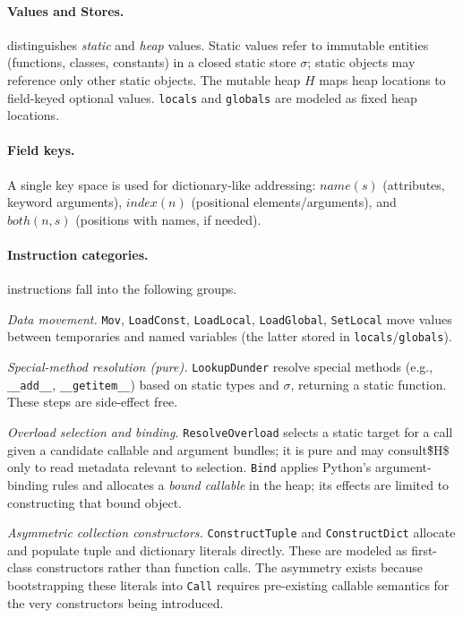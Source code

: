 \paragraph{Values and Stores.}
\spytecode distinguishes \emph{static} and \emph{heap} values. Static values refer to immutable entities (functions, classes, constants) in a closed static store $\sigma$; static objects may reference only other static objects. The mutable heap $H$ maps heap locations to field-keyed optional values. \texttt{locals} and \texttt{globals} are modeled as fixed heap locations.

\paragraph{Field keys.}
A single key space is used for dictionary-like addressing:
$\mathit{name}(s)$ (attributes, keyword arguments),
$\mathit{index}(n)$ (positional elements/arguments), and
$\mathit{both}(n,s)$ (positions with names, if needed).

\paragraph{Instruction categories.}
\spytecode instructions fall into the following groups.

\smallskip
\noindent\emph{Data movement.}
\texttt{Mov}, \texttt{LoadConst}, \texttt{LoadLocal}, \texttt{LoadGlobal}, \texttt{SetLocal} move values between temporaries and named variables (the latter stored in \texttt{locals}/\texttt{globals}).

\smallskip
\noindent\emph{Special-method resolution (pure).}
\texttt{LookupDunder} resolve special methods (e.g., \texttt{\_\_add\_\_}, \texttt{\_\_getitem\_\_}) based on static types and $\sigma$, returning a static function. These steps are side-effect free.

\smallskip
\noindent\emph{Overload selection and binding.}
\texttt{ResolveOverload} selects a static target for a call given a candidate callable and argument bundles; it is pure and may consult\~\$H\$ only to read metadata relevant to selection. \texttt{Bind} applies Python’s argument-binding rules and allocates a \emph{bound callable} in the heap; its effects are limited to constructing that bound object.

\smallskip
\noindent\emph{Asymmetric collection constructors.}
\texttt{ConstructTuple} and \texttt{ConstructDict} allocate and populate tuple and dictionary literals directly. These are modeled as first-class constructors rather than function calls. The asymmetry exists because bootstrapping these literals into \texttt{Call} requires pre-existing callable semantics for the very constructors being introduced.

